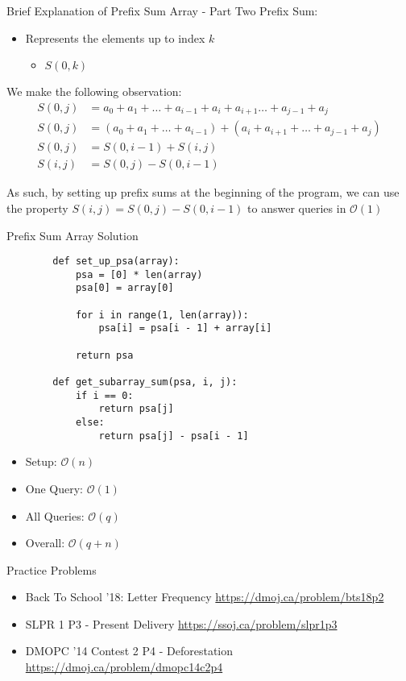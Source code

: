 \documentclass{beamer}
\begin{document}
\begin{frame}{Brief Explanation of Prefix Sum Array - Part Two}
Prefix Sum:
\begin{itemize}
    \item Represents the elements up to index $k$
    \begin{itemize}
        \item $S(0, k)$
    \end{itemize}
\end{itemize} 

We make the following observation:
\begin{align*}
    S(0, j) &= a_0 + a_1 + \dots + a_{i - 1} + a_{i} + a_{i + 1} \dots + a_{j - 1} + a_{j} \\
    S(0, j) &= (a_0 + a_1 + \dots + a_{i - 1}) + (a_{i} + a_{i + 1} + \dots + a_{j - 1} + a_{j}) \\
    S(0, j) &= S(0, i - 1) + S(i, j) \\
    S(i, j) &= S(0, j) - S(0, i - 1)
\end{align*}

As such, by setting up prefix sums at the beginning of the program, we can use the property $S(i, j) = S(0, j) - S(0, i - 1)$ to answer queries in $\mathcal{O}(1)$

\end{frame}

\begin{frame}[fragile]{Prefix Sum Array Solution}
    \begin{lstlisting}
        def set_up_psa(array):
            psa = [0] * len(array)
            psa[0] = array[0]
            
            for i in range(1, len(array)):
                psa[i] = psa[i - 1] + array[i]
        
            return psa
        
        def get_subarray_sum(psa, i, j):
            if i == 0:
                return psa[j]
            else:
                return psa[j] - psa[i - 1]
    \end{lstlisting}
    
    \begin{itemize}
        \item Setup: $\mathcal{O}(n)$
        \item One Query: $\mathcal{O}(1)$
        \item All Queries: $\mathcal{O}(q)$
        \item Overall: $\mathcal{O}(q + n)$
    \end{itemize}
\end{frame}

\begin{frame}{Practice Problems}
\begin{itemize}
    \item Back To School '18: Letter Frequency \url{https://dmoj.ca/problem/bts18p2}
    \item SLPR 1 P3 - Present Delivery \url{https://ssoj.ca/problem/slpr1p3}
    \item DMOPC '14 Contest 2 P4 - Deforestation \url{https://dmoj.ca/problem/dmopc14c2p4}
\end{itemize}


\end{frame}
\end{document}
